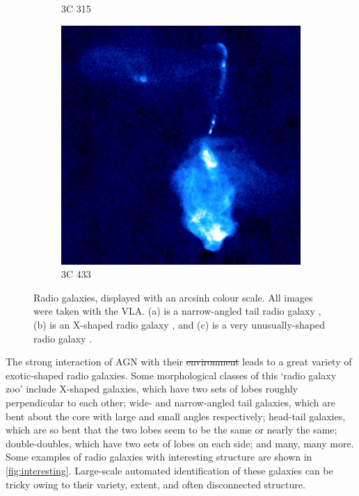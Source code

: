 \documentclass[11pt, a4paper]{book}
\providecommand{\DIFaddtex}[1]{{\protect\color{blue}\uwave{#1}}} %
\providecommand{\DIFdeltex}[1]{{\protect\color{red}\sout{#1}}}                      %
\providecommand{\DIFaddbegin}{} %
\providecommand{\DIFaddend}{} %
\providecommand{\DIFdelbegin}{} %
\providecommand{\DIFdelend}{} %
\providecommand{\DIFadd}[1]{\texorpdfstring{\DIFaddtex{#1}}{#1}} %
\providecommand{\DIFdel}[1]{\texorpdfstring{\DIFdeltex{#1}}{}} %
\newcommand{\DIFscaledelfig}{0.5}
\newlength{\DIFdelgraphicswidth} %
\newlength{\DIFdelgraphicsheight} %
\newcommand{\DIFaddincludegraphics}[2][]{{\color{blue}\fbox{\DIFOincludegraphics[#1]{#2}}}} %
\newcommand{\DIFdelincludegraphics}[2][]{%
\sbox{\DIFdelgraphicsbox}{\DIFOincludegraphics[#1]{#2}}%
\settoboxwidth{\DIFdelgraphicswidth}{\DIFdelgraphicsbox} %
\settoboxtotalheight{\DIFdelgraphicsheight}{\DIFdelgraphicsbox} %
\scalebox{\DIFscaledelfig}{%
\parbox[b]{\DIFdelgraphicswidth}{\usebox{\DIFdelgraphicsbox}\\[-\baselineskip] \rule{\DIFdelgraphicswidth}{0em}}\llap{\resizebox{\DIFdelgraphicswidth}{\DIFdelgraphicsheight}{%
\setlength{\unitlength}{\DIFdelgraphicswidth}%
\begin{picture}(1,1)%
\thicklines\linethickness{2pt} %
{\color[rgb]{1,0,0}\put(0,0){\framebox(1,1){}}}%
{\color[rgb]{1,0,0}\put(0,0){\line( 1,1){1}}}%
{\color[rgb]{1,0,0}\put(0,1){\line(1,-1){1}}}%
\end{picture}%
}\hspace*{3pt}}} %
} %
\DeclareRobustCommand{\DIFaddbegin}{\DIFOaddbegin \let\includegraphics\DIFaddincludegraphics} %
\DeclareRobustCommand{\DIFaddend}{\DIFOaddend \let\includegraphics\DIFOincludegraphics} %
\DeclareRobustCommand{\DIFdelbegin}{\DIFOdelbegin \let\includegraphics\DIFdelincludegraphics} %
\DeclareRobustCommand{\DIFdelend}{\DIFOaddend \let\includegraphics\DIFOincludegraphics} %
\begin{document}
\begin{figure}
\begin{subfigure}{0.3\textwidth}
                \caption{3C 315}
                \label{fig:3C315}
            \end{subfigure}
            \begin{subfigure}{0.3\textwidth}
                \includegraphics[width=\textwidth]{images/3C_433.jpg}
                \caption{3C 433}
                \label{fig:3C433}
            \end{subfigure}
            \caption[Three radio galaxies with interesting structure.]{Radio galaxies, displayed with an arcsinh colour scale. All images were taken with the VLA. (a) is a narrow-angled tail radio galaxy \citep{leahy_atlas_nodate}, (b) is an X-shaped radio galaxy \citep{leahy_polarization_1986}, and (c) is a very unusually-shaped radio galaxy \citep{black_study_1992}.}
            \label{fig:interesting}
        \end{figure}

        The strong interaction of AGN with their \DIFdelbegin \DIFdel{environment }\DIFdelend \DIFaddbegin \DIFadd{environments }\DIFaddend leads to a great variety of exotic-shaped radio galaxies. Some morphological classes of this `radio galaxy zoo' include X-shaped galaxies, which have two sets of lobes roughly perpendicular to each other; wide- and narrow-angled tail galaxies, which are bent about the core with large and small angles respectively; head-tail galaxies, which are so bent that the two lobes seem to be the same or nearly the same; double-doubles, which have two sets of lobes on each side; and many, many more. Some examples of radio galaxies with interesting structure are shown in \autoref{fig:interesting}. Large-scale automated identification of these galaxies can be tricky owing to their variety, extent, and often disconnected structure.
\end{document}
